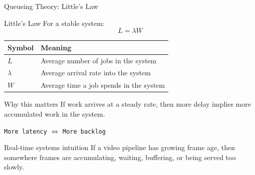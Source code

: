 \documentclass[aspectratio=169]{beamer}
\begin{document}
\begin{frame}{Queueing Theory: Little's Law}
\tiny

\begin{block}{Little's Law}
For a stable system:
\[
L = \lambda W
\]
\end{block}

\begin{center}
\begin{tabular}{p{2.2cm} p{8.2cm}}
\toprule
\textbf{Symbol} & \textbf{Meaning} \\
\midrule
$L$ & Average number of jobs in the system \\
$\lambda$ & Average arrival rate into the system \\
$W$ & Average time a job spends in the system \\
\bottomrule
\end{tabular}
\end{center}

\begin{block}{Why this matters}
If work arrives at a steady rate, then more delay implies more accumulated work in the system.
\end{block}

\begin{center}
\texttt{More latency} $\Longleftrightarrow$ \texttt{More backlog}
\end{center}


\begin{alertblock}{Real-time systems intuition}
If a video pipeline has growing frame age, then somewhere frames are accumulating, waiting, buffering, or being served too slowly.
\end{alertblock}

\end{frame}
\end{document}

